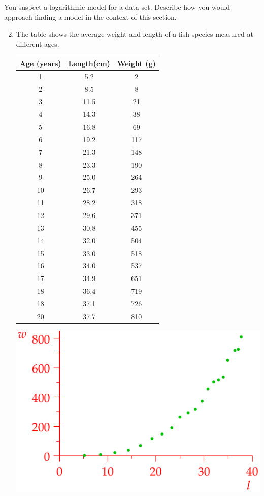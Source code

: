 \begin{exercises}{}{}
	\exstart You suspect a logarithmic model for a data set. Describe how you would approach finding a model in the context of this section.
	
	\begin{enumerate}\setcounter{enumi}{1}
	  \item The table shows the average weight and length of a fish species measured at different ages.\par
		\begin{minipage}[t]{0.45\linewidth}\vspace{0pt}
			\centering
			\begin{tabular}{c|c|c}
				Age (years)&Length(cm)& Weight (g)\\\hline\hline
				1 & 5.2 & 2\\
				2 & 8.5 & 8\\
				3 & 11.5 & 21\\
				4 & 14.3 & 38\\
				5 & 16.8 & 69\\
				6 & 19.2 & 117\\
				7 & 21.3 & 148\\
				8 & 23.3 & 190\\
				9 & 25.0 & 264\\
				10 & 26.7 & 293\\
				11 & 28.2 & 318\\
				12 & 29.6 & 371\\
				13 & 30.8 & 455\\
				14 & 32.0 & 504\\
				15 & 33.0 & 518\\
				16 & 34.0 & 537\\
				17 & 34.9 & 651\\
				18 & 36.4 & 719\\
				18 & 37.1 & 726\\
				20 & 37.7 & 810
			\end{tabular}
		\end{minipage}
		\hfill
		\begin{minipage}[t]{0.54\linewidth}\vspace{0pt}
			\hfill\includegraphics[scale=0.95]{fishexp}

\end{minipage}
\end{enumerate}
\end{exercises}
